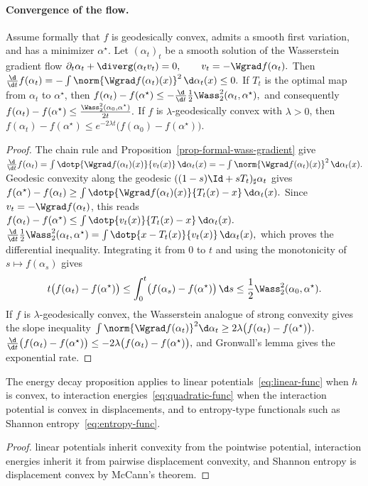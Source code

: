 \paragraph{Convergence of the flow.}
\begin{prop}\label{prop-convex-wass-flow-rate}
Assume formally that $f$ is geodesically convex, admits a smooth first variation, and has a minimizer $\alpha^\star$. Let $(\alpha_t)_t$ be a smooth solution of the Wasserstein gradient flow
\(\partial_t\alpha_t+\diverg(\alpha_t v_t)=0, \qquad v_t=-\Wgrad f(\alpha_t).\)
Then
\(\frac{\d}{\d t} f(\alpha_t) = -\int \norm{\Wgrad f(\alpha_t)(x)}^2\,\d\alpha_t(x) \leq 0.\)
If $T_t$ is the optimal map from $\alpha_t$ to $\alpha^\star$, then
\(f(\alpha_t)-f(\alpha^\star) \leq -\frac{\d}{\d t}\frac12 \Wass_2^2(\alpha_t,\alpha^\star),\)
and consequently
\(f(\alpha_t)-f(\alpha^\star) \leq \frac{\Wass_2^2(\alpha_0,\alpha^\star)}{2t}.\)
If $f$ is $\lambda$-geodesically convex with $\lambda>0$, then
\(f(\alpha_t)-f(\alpha^\star) \leq e^{-2\lambda t}\bigl(f(\alpha_0)-f(\alpha^\star)\bigr).\)
\end{prop}
\begin{proof}
The chain rule and Proposition~\ref{prop-formal-wass-gradient} give
\(\frac{\d}{\d t}f(\alpha_t) = \int \dotp{\Wgrad f(\alpha_t)(x)}{v_t(x)}\,\d\alpha_t(x) = -\int \norm{\Wgrad f(\alpha_t)(x)}^2\,\d\alpha_t(x).\)
Geodesic convexity along the geodesic
$((1-s)\Id+sT_t)_\sharp\alpha_t$ gives \(f(\alpha^\star)-f(\alpha_t) \geq \int \dotp{\Wgrad f(\alpha_t)(x)}{T_t(x)-x}\,\d\alpha_t(x).\)
Since $v_t=-\Wgrad f(\alpha_t)$, this reads \(f(\alpha_t)-f(\alpha^\star) \leq \int \dotp{v_t(x)}{T_t(x)-x}\,\d\alpha_t(x).\)
\(\frac{\d}{\d t}\frac12\Wass_2^2(\alpha_t,\alpha^\star) = \int \dotp{x-T_t(x)}{v_t(x)}\,\d\alpha_t(x),\)
which proves the differential inequality. Integrating it from $0$ to $t$ and using the monotonicity of $s\mapsto f(\alpha_s)$ gives
\[
t\bigl(f(\alpha_t)-f(\alpha^\star)\bigr)
\leq
\int_0^t \bigl(f(\alpha_s)-f(\alpha^\star)\bigr)\,\d s
\leq
\frac12\Wass_2^2(\alpha_0,\alpha^\star).
\]
If $f$ is $\lambda$-geodesically convex, the Wasserstein analogue of strong convexity gives the slope inequality
\(\int\norm{\Wgrad f(\alpha_t)}^2\d\alpha_t \geq 2\lambda\bigl(f(\alpha_t)-f(\alpha^\star)\bigr).\)
\(\frac{\d}{\d t}\bigl(f(\alpha_t)-f(\alpha^\star)\bigr) \leq -2\lambda\bigl(f(\alpha_t)-f(\alpha^\star)\bigr),\)
and Gronwall's lemma gives the exponential rate.
\end{proof}
\begin{prop}\label{prop-convex-flow-examples}
The energy decay proposition applies to linear potentials~\eqref{eq:linear-func} when $h$ is convex, to interaction energies~\eqref{eq:quadratic-func} when the interaction potential is convex in displacements, and to entropy-type functionals such as Shannon entropy~\eqref{eq:entropy-func}.
\end{prop}
\begin{proof}
linear potentials inherit convexity from the pointwise potential, interaction energies inherit it from pairwise displacement convexity, and Shannon entropy is displacement convex by McCann's theorem.
\end{proof}
